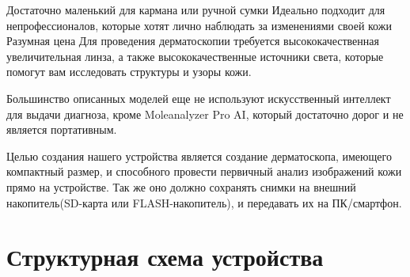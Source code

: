 \begin{sloppypar}
Достаточно маленький для кармана или ручной сумки
Идеально подходит для непрофессионалов, которые хотят лично наблюдать за изменениями своей кожи
Разумная цена
Для проведения дерматоскопии требуется высококачественная увеличительная линза, а также высококачественные источники света, которые помогут вам исследовать структуры и узоры кожи.

Большинство описанных моделей еще не используют искусственный интеллект для выдачи диагноза, кроме Moleanalyzer Pro AI, который достаточно дорог и не является портативным. 

Целью создания нашего устройства является создание дерматоскопа, имеющего компактный размер, и способного провести первичный анализ изображений кожи прямо на устройстве. Так же оно должно  сохранять снимки на внешний накопитель(SD-карта или FLASH-накопитель), и передавать их на ПК/смартфон.

\section{Структурная схема устройства} %


\end{sloppypar}
